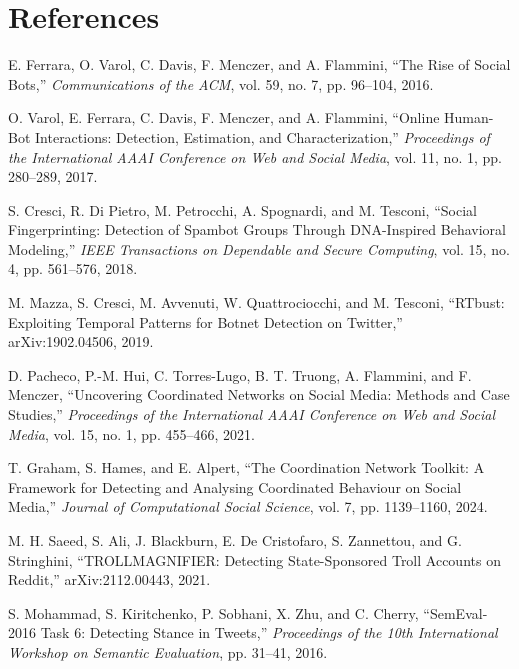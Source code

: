 \documentclass[conference]{IEEEtran}
\begin{document}
\section*{References}
\small
\noindent [1] E. Ferrara, O. Varol, C. Davis, F. Menczer, and A. Flammini, ``The Rise of Social Bots,'' \textit{Communications of the ACM}, vol. 59, no. 7, pp. 96--104, 2016.\par
\noindent [2] O. Varol, E. Ferrara, C. Davis, F. Menczer, and A. Flammini, ``Online Human-Bot Interactions: Detection, Estimation, and Characterization,'' \textit{Proceedings of the International AAAI Conference on Web and Social Media}, vol. 11, no. 1, pp. 280--289, 2017.\par
\noindent [3] S. Cresci, R. Di Pietro, M. Petrocchi, A. Spognardi, and M. Tesconi, ``Social Fingerprinting: Detection of Spambot Groups Through DNA-Inspired Behavioral Modeling,'' \textit{IEEE Transactions on Dependable and Secure Computing}, vol. 15, no. 4, pp. 561--576, 2018.\par
\noindent [4] M. Mazza, S. Cresci, M. Avvenuti, W. Quattrociocchi, and M. Tesconi, ``RTbust: Exploiting Temporal Patterns for Botnet Detection on Twitter,'' arXiv:1902.04506, 2019.\par
\noindent [5] D. Pacheco, P.-M. Hui, C. Torres-Lugo, B. T. Truong, A. Flammini, and F. Menczer, ``Uncovering Coordinated Networks on Social Media: Methods and Case Studies,'' \textit{Proceedings of the International AAAI Conference on Web and Social Media}, vol. 15, no. 1, pp. 455--466, 2021.\par
\noindent [6] T. Graham, S. Hames, and E. Alpert, ``The Coordination Network Toolkit: A Framework for Detecting and Analysing Coordinated Behaviour on Social Media,'' \textit{Journal of Computational Social Science}, vol. 7, pp. 1139--1160, 2024.\par
\noindent [7] M. H. Saeed, S. Ali, J. Blackburn, E. De Cristofaro, S. Zannettou, and G. Stringhini, ``TROLLMAGNIFIER: Detecting State-Sponsored Troll Accounts on Reddit,'' arXiv:2112.00443, 2021.\par
\noindent [8] S. Mohammad, S. Kiritchenko, P. Sobhani, X. Zhu, and C. Cherry, ``SemEval-2016 Task 6: Detecting Stance in Tweets,'' \textit{Proceedings of the 10th International Workshop on Semantic Evaluation}, pp. 31--41, 2016.\par
\end{document}
